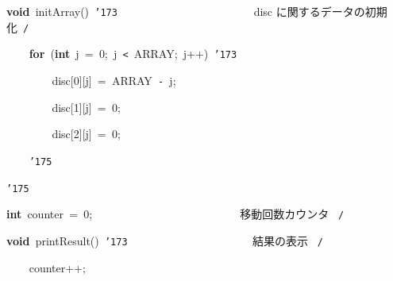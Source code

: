 \documentclass[a4paper,10pt]{article}
\def\mc{\relax}
\begin{document}
\noindent
\mbox{}\hfill

\noindent
\mbox{}\textbf{void}{\tt\mc \ }initArray(){\tt\mc \ }{\tt\char'173}{\tt\mc \ }{\tt\mc \ }{\tt\mc \ }{\tt\mc \ }{\tt\mc \ }{\tt\mc \ }{\tt\mc \ }{\tt\mc \ }{\tt\mc \ }{\tt\mc \ }{\tt\mc \ }{\tt\mc \ }{\tt\mc \ }{\tt\mc \ }{\tt\mc \ }{\tt\mc \ }{\tt\mc \ }{\tt\mc \ }{\tt\mc \ }{\tt\mc \ }{\tt\mc \ }{\tt\mc \ }\rm\mc {\tt /}{\tt *}\  \ disc に関するデータの初期化\hfill \rm\mc \ {\tt *}{\tt /}
\tt\mc 

\noindent
\mbox{}{\tt\mc \ }{\tt\mc \ }{\tt\mc \ }{\tt\mc \ }\textbf{for}{\tt\mc \ }(\textbf{int}{\tt\mc \ }j{\tt\mc \ }={\tt\mc \ }0;{\tt\mc \ }j{\tt\mc \ }{\tt <}{\tt\mc \ }ARRAY;{\tt\mc \ }j++){\tt\mc \ }{\tt\char'173}

\noindent
\mbox{}{\tt\mc \ }{\tt\mc \ }{\tt\mc \ }{\tt\mc \ }{\tt\mc \ }{\tt\mc \ }{\tt\mc \ }{\tt\mc \ }disc[0][j]{\tt\mc \ }={\tt\mc \ }ARRAY{\tt\mc \ }{\tt -}{\tt\mc \ }j;

\noindent
\mbox{}{\tt\mc \ }{\tt\mc \ }{\tt\mc \ }{\tt\mc \ }{\tt\mc \ }{\tt\mc \ }{\tt\mc \ }{\tt\mc \ }disc[1][j]{\tt\mc \ }={\tt\mc \ }0;

\noindent
\mbox{}{\tt\mc \ }{\tt\mc \ }{\tt\mc \ }{\tt\mc \ }{\tt\mc \ }{\tt\mc \ }{\tt\mc \ }{\tt\mc \ }disc[2][j]{\tt\mc \ }={\tt\mc \ }0;

\noindent
\mbox{}{\tt\mc \ }{\tt\mc \ }{\tt\mc \ }{\tt\mc \ }{\tt\char'175}

\noindent
\mbox{}{\tt\char'175}

\noindent
\mbox{}\hfill

\noindent
\mbox{}\textbf{int}{\tt\mc \ }counter{\tt\mc \ }={\tt\mc \ }0;{\tt\mc \ }{\tt\mc \ }{\tt\mc \ }{\tt\mc \ }{\tt\mc \ }{\tt\mc \ }{\tt\mc \ }{\tt\mc \ }{\tt\mc \ }{\tt\mc \ }{\tt\mc \ }{\tt\mc \ }{\tt\mc \ }{\tt\mc \ }{\tt\mc \ }{\tt\mc \ }{\tt\mc \ }{\tt\mc \ }{\tt\mc \ }{\tt\mc \ }{\tt\mc \ }{\tt\mc \ }{\tt\mc \ }{\tt\mc \ }\rm\mc {\tt /}{\tt *}\  \ 移動回数カウンタ \hfill \rm\mc \ {\tt *}{\tt /}
\tt\mc 

\noindent
\mbox{}\hfill

\noindent
\mbox{}\textbf{void}{\tt\mc \ }printResult(){\tt\mc \ }{\tt\char'173}{\tt\mc \ }{\tt\mc \ }{\tt\mc \ }{\tt\mc \ }{\tt\mc \ }{\tt\mc \ }{\tt\mc \ }{\tt\mc \ }{\tt\mc \ }{\tt\mc \ }{\tt\mc \ }{\tt\mc \ }{\tt\mc \ }{\tt\mc \ }{\tt\mc \ }{\tt\mc \ }{\tt\mc \ }{\tt\mc \ }{\tt\mc \ }{\tt\mc \ }\rm\mc {\tt /}{\tt *}\  \ 結果の表示 \hfill \rm\mc \ {\tt *}{\tt /}
\tt\mc 

\noindent
\mbox{}{\tt\mc \ }{\tt\mc \ }{\tt\mc \ }{\tt\mc \ }counter++;
\end{document}
